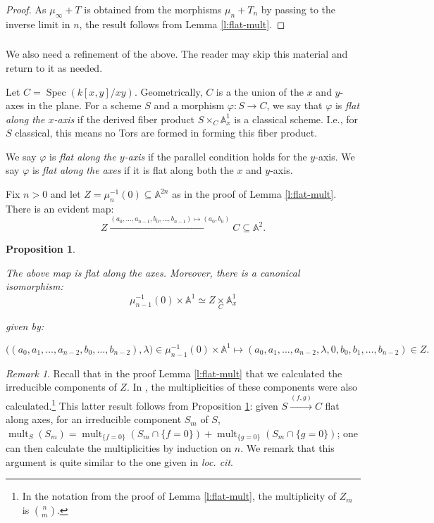 \documentclass[reqno,11pt]{amsart}
\numberwithin{equation}{subsection}
\newtheorem{prop}[thm]{Proposition}
\theoremstyle{remark}
\newtheorem{rem}[thm]{Remark}
\newcommand{\xar}[1]{\xrightarrow{#1}}
\newcommand{\bA}{{\mathbb A}}
\newcommand{\on}{\operatorname}
\newcommand{\Spec}{\on{Spec}}
\newcommand{\vph}{\varphi}
\renewcommand{\subset}{\subseteq}
\begin{document}
\begin{proof}

As $\mu_{\infty}+T$ is obtained from the morphisms
$\mu_n+T_n$ by passing to the inverse limit in $n$, the
result follows from Lemma \ref{l:flat-mult}.

\end{proof}

\subsubsection{}\label{ss:refinement}

We also need a refinement of the above. The reader may skip this
material and return to it as needed.

Let $C = \Spec(k[x,y]/xy)$. Geometrically, $C$ is a the union of the
$x$ and $y$-axes in the plane. For a scheme $S$ and a morphism 
$\vph:S \to C$, we say that $\vph$ is \emph{flat along the $x$-axis}
if the derived fiber product $S \times_C \bA_x^1$ is a classical
scheme. I.e., for $S$ classical, this means no Tors are formed in
forming this fiber product.

We say $\vph$ is \emph{flat along the $y$-axis} if 
the parallel condition holds for the $y$-axis.
We say $\vph$ is \emph{flat along the axes} if it
is flat along both the $x$ and $y$-axis.

Fix $n>0$ and let $Z = \mu_n^{-1}(0) \subset \bA^{2n}$ as in
the proof of Lemma \ref{l:flat-mult}. 
There
is an evident map:
%
\[
Z \xar{(a_0,\ldots,a_{n-1},b_0,\ldots,b_{n-1}) \mapsto (a_0,b_0)} C 
\subset \bA^2.
\]

\begin{prop}\label{p:flat-axis}

The above map is flat along the axes.
Moreover, there is a canonical isomorphism:
%
\[
\mu_{n-1}^{-1}(0) \times \bA^1 \simeq Z \underset{C}{\times} \bA_x^1
\]

\noindent given by:

%
\[
\big((a_0,a_1,\ldots,a_{n-2},b_0,\ldots,b_{n-2}),\lambda\big) \in 
\mu_{n-1}^{-1}(0) \times \bA^1 \mapsto 
(a_0,a_1,\ldots,a_{n-2},\lambda,0,b_0,b_1,\ldots,b_{n-2}) \in Z.
\]

\end{prop}

\begin{rem}

Recall that in the proof Lemma \ref{l:flat-mult} that we calculated 
the irreducible components of $Z$. In \cite{yuen}, the multiplicities
of these components were also calculated.\footnote{In the notation from 
the proof of Lemma \ref{l:flat-mult}, the multiplicity of
$Z_m$ is $\binom{n}{m}$.}
This latter result follows from Proposition \ref{p:flat-axis}:
given $S \xar{(f,g)} C$ flat along axes, for an irreducible 
component $S_m$ of $S$, $\on{mult}_S(S_m) = 
\on{mult}_{\{f = 0\}}(S_m \cap \{f = 0\}) + \on{mult}_{\{g = 0\}}(S_m \cap \{g = 0\})$;
one can then calculate the multiplicities by induction on $n$. 
We remark that this argument is quite similar to the one given in \emph{loc. cit}.

\end{rem}
\end{document}

